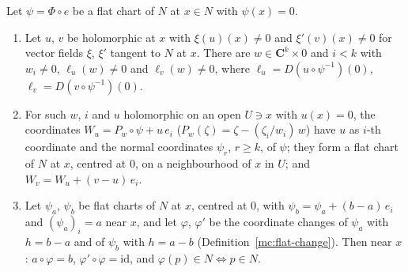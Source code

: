 \begin{lemma}
\label{mc:coordinate-pair-along}
\leanok
Let \(\psi=\Phi\circ e\) be a flat chart of \(N\) at \(x\in N\) with \(\psi(x)=0\).
\begin{enumerate}
\item Let \(u\), \(v\) be holomorphic at \(x\) with \(\xi(u)(x)\ne0\) and \(\xi'(v)(x)\ne0\) for vector fields \(\xi\), \(\xi'\) tangent to \(N\) at \(x\). There are
\(w\in\mathbf C^k\times0\) and \(i<k\) with \(w_i\ne0\), \(\ell_u(w)\ne0\) and \(\ell_v(w)\ne0\), where \(\ell_u=D(u\circ\psi^{-1})(0)\), \(\ell_v=D(v\circ\psi^{-1})(0)\).
\item For such \(w\), \(i\) and \(u\) holomorphic on an open \(U\ni x\) with \(u(x)=0\), the coordinates \(W_u=P_w\circ\psi+u\,e_i\) (\(P_w(\zeta)=\zeta-(\zeta_i/w_i)\,w\))
have \(u\) as \(i\)-th coordinate and the normal coordinates \(\psi_r\), \(r\ge k\), of \(\psi\); they form a flat chart of \(N\) at \(x\), centred at \(0\), on a neighbourhood of \(x\) in \(U\);
and \(W_v=W_u+(v-u)\,e_i\).
\item Let \(\psi_a\), \(\psi_b\) be flat charts of \(N\) at \(x\), centred at \(0\), with \(\psi_b=\psi_a+(b-a)\,e_i\) and \((\psi_a)_i=a\) near \(x\), and let \(\varphi\), \(\varphi'\) be the
coordinate changes of \(\psi_a\) with \(h=b-a\) and of \(\psi_b\) with \(h=a-b\) (Definition~\ref{mc:flat-change}). Then near \(x\): \(a\circ\varphi=b\), \(\varphi'\circ\varphi=\mathrm{id}\), and
\(\varphi(p)\in N\iff p\in N\).
\end{enumerate}
\end{lemma}
